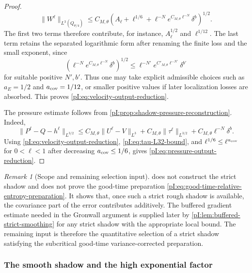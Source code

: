 \documentclass[11pt]{article}
\numberwithin{equation}{section}
\theoremstyle{plain}
\theoremstyle{definition}
\theoremstyle{remark}
\newtheorem{remark}{Remark}[section]
\begin{document}
\begin{proof}
\[
        \|W^\ell\|_{L^3(Q_{\theta/4})}
        \le C_{M,\theta}
        \left(
        A_\ell+\ell^{1/6}+\ell^{-N}e^{C_{M,\theta}\ell^{-N}}\delta^b
        \right)^{1/2}.
\]
The first two terms therefore contribute, for instance, \(A_\ell^{1/2}\) and \(\ell^{1/12}\).  The last term retains the separated logarithmic form after renaming the finite loss and the small exponent, since
\[
        \left(\ell^{-N}e^{C_{M,\theta}\ell^{-N}}\delta^b\right)^{1/2}
        \le
        \ell^{-N'}e^{C'_{M,\theta}\ell^{-N'}}\delta^{b'}
\]
for suitable positive \(N',b'\).  Thus one may take explicit admissible choices such as \(a_E=1/2\) and \(a_{\rm cov}=1/12\), or smaller positive values if later localization losses are absorbed.  This proves \eqref{pI:eq:velocity-output-reduction}.

The pressure estimate follows from \cref{pI:prop:shadow-pressure-reconstruction}.  Indeed,
\[
        \|P^\ell-Q-h^\ell\|_{L^{3/2}}
        \le
        C_{M,\theta}\|U^\ell-V\|_{L^3}
        +C_{M,\theta}\|\tau^\ell\|_{L^{3/2}}
        +C_{M,\theta}\ell^{-N}\delta^b.
\]
Using \eqref{pI:eq:velocity-output-reduction}, \eqref{pI:eq:tau-L32-bound}, and \(\ell^{1/6}\le \ell^{a_{\rm cov}}\) for \(0<\ell<1\) after decreasing \(a_{\rm cov}\le1/6\), gives \eqref{pI:eq:pressure-output-reduction}.
\end{proof}

\begin{remark}[Scope and remaining selection input]\label{pI:rem:missing-after-reduction}
 does not construct the strict shadow and does not prove the good-time preparation \eqref{pI:eq:good-time-relative-entropy-preparation}.  It shows that, once such a strict rough shadow is available, the covariance part of the error contributes additively.  The buffered gradient estimate needed in the Gronwall argument is supplied later by \cref{pI:lem:buffered-strict-smoothing} for any strict shadow with the appropriate local bound.  The remaining input is therefore the quantitative selection of a strict shadow satisfying the subcritical good-time variance-corrected preparation.
\end{remark}

\subsubsection{The smooth shadow and the high exponential factor}
\end{document}
